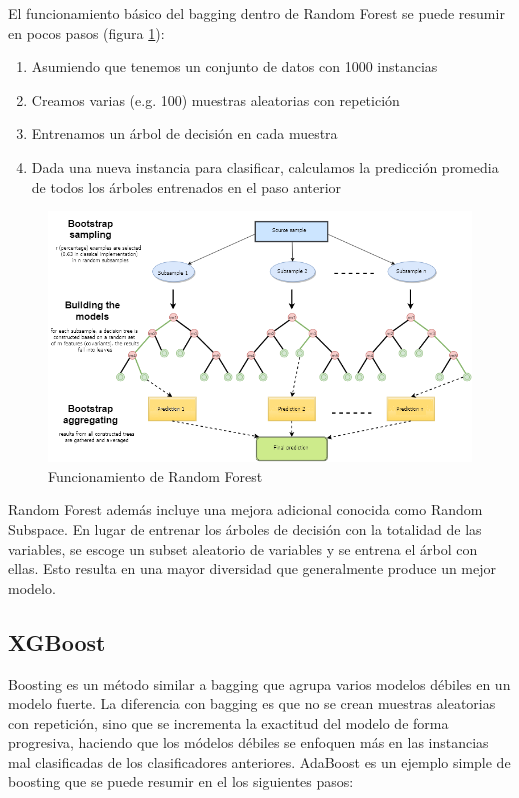 El funcionamiento básico del bagging dentro de Random Forest se puede resumir en pocos pasos (figura \ref{fig:rf}):

\begin{enumerate}
    \item Asumiendo que tenemos un conjunto de datos con 1000 instancias
    \item Creamos varias (e.g. 100) muestras aleatorias con repetición
    \item Entrenamos un árbol de decisión en cada muestra
    \item Dada una nueva instancia para clasificar, calculamos la predicción promedia de todos los árboles entrenados en el paso anterior
\end{enumerate}

\begin{figure}[htbp]
    \centering
    \includegraphics[width=\linewidth]{graficos/rf.png}
    \caption{Funcionamiento de Random Forest \citep{mql5:rf}}
    \label{fig:rf}
\end{figure}

Random Forest además incluye una mejora adicional conocida como Random Subspace. En lugar de entrenar los árboles de decisión con la totalidad de las variables, se escoge un subset aleatorio de variables y se entrena el árbol con ellas. Esto resulta en una mayor diversidad que generalmente produce un mejor modelo.

\subsection{XGBoost}

Boosting es un método similar a bagging que agrupa varios modelos débiles en un modelo fuerte. La diferencia con bagging es que no se crean muestras aleatorias con repetición, sino que se incrementa la exactitud del modelo de forma progresiva, haciendo que los módelos débiles se enfoquen más en las instancias mal clasificadas de los clasificadores anteriores. AdaBoost es un ejemplo simple de boosting que se puede resumir en el los siguientes pasos:

